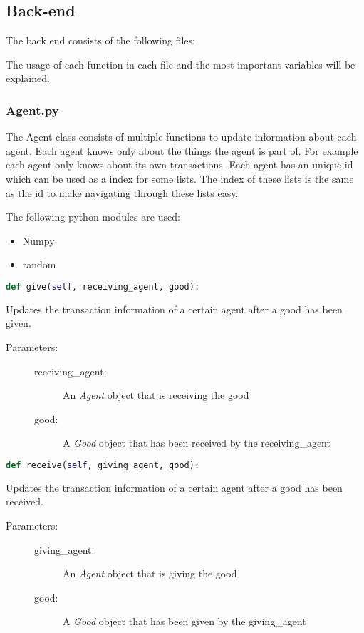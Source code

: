 \documentclass{article}
\begin{document}
\subsection{Back-end}
The back end consists of the following files:

The usage of each function in each file and the most important variables will be explained.

\subsubsection{Agent.py}
The Agent class consists of multiple functions to update information about each agent. Each agent knows only about the things the agent is part of. For example each agent only knows about its own transactions. Each agent has an unique id which can be used as a index for some lists. The index of these lists is the same as the id to make navigating through these lists easy.

The following python modules are used:
\begin{itemize}
  \item Numpy
  \item random
\end{itemize}


\begin{lstlisting}[language=Python]
def give(self, receiving_agent, good):
\end{lstlisting}
Updates the transaction information of a certain agent after a good has been given.

\begin{description}
  \item[Parameters:] \hfill
	\begin{description}
  		\item[receiving\_agent:] An \textit{Agent} object that is receiving the good
  		\item[good:] A \textit{Good} object that has been received by the receiving\_agent
	\end{description}

\end{description}

\begin{lstlisting}[language=Python]
def receive(self, giving_agent, good):
\end{lstlisting}
Updates the transaction information of a certain agent after a good has been received.

\begin{description}
  \item[Parameters:] \hfill
	\begin{description}
  		\item[giving\_agent:] An \textit{Agent} object that is giving the good
  		\item[good:] A \textit{Good} object that has been given by the giving\_agent
	\end{description}

\end{description}
\end{document}
